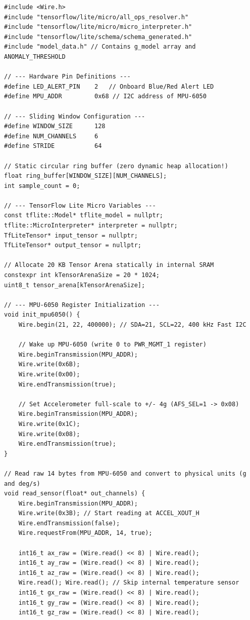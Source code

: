 \begin{lstlisting}[style=pythonstyle, caption={Production ESP32 C++ Anomaly Detection Firmware with TFLM.}, label={lst:esp32_firmware}]
#include <Wire.h>
#include "tensorflow/lite/micro/all_ops_resolver.h"
#include "tensorflow/lite/micro/micro_interpreter.h"
#include "tensorflow/lite/schema/schema_generated.h"
#include "model_data.h" // Contains g_model array and ANOMALY_THRESHOLD

// --- Hardware Pin Definitions ---
#define LED_ALERT_PIN    2   // Onboard Blue/Red Alert LED
#define MPU_ADDR         0x68 // I2C address of MPU-6050

// --- Sliding Window Configuration ---
#define WINDOW_SIZE      128
#define NUM_CHANNELS     6
#define STRIDE           64

// Static circular ring buffer (zero dynamic heap allocation!)
float ring_buffer[WINDOW_SIZE][NUM_CHANNELS];
int sample_count = 0;

// --- TensorFlow Lite Micro Variables ---
const tflite::Model* tflite_model = nullptr;
tflite::MicroInterpreter* interpreter = nullptr;
TfLiteTensor* input_tensor = nullptr;
TfLiteTensor* output_tensor = nullptr;

// Allocate 20 KB Tensor Arena statically in internal SRAM
constexpr int kTensorArenaSize = 20 * 1024;
uint8_t tensor_arena[kTensorArenaSize];

// --- MPU-6050 Register Initialization ---
void init_mpu6050() {
    Wire.begin(21, 22, 400000); // SDA=21, SCL=22, 400 kHz Fast I2C
    
    // Wake up MPU-6050 (write 0 to PWR_MGMT_1 register)
    Wire.beginTransmission(MPU_ADDR);
    Wire.write(0x6B);
    Wire.write(0x00);
    Wire.endTransmission(true);

    // Set Accelerometer full-scale to +/- 4g (AFS_SEL=1 -> 0x08)
    Wire.beginTransmission(MPU_ADDR);
    Wire.write(0x1C);
    Wire.write(0x08);
    Wire.endTransmission(true);
}

// Read raw 14 bytes from MPU-6050 and convert to physical units (g and deg/s)
void read_sensor(float* out_channels) {
    Wire.beginTransmission(MPU_ADDR);
    Wire.write(0x3B); // Start reading at ACCEL_XOUT_H
    Wire.endTransmission(false);
    Wire.requestFrom(MPU_ADDR, 14, true);

    int16_t ax_raw = (Wire.read() << 8) | Wire.read();
    int16_t ay_raw = (Wire.read() << 8) | Wire.read();
    int16_t az_raw = (Wire.read() << 8) | Wire.read();
    Wire.read(); Wire.read(); // Skip internal temperature sensor
    int16_t gx_raw = (Wire.read() << 8) | Wire.read();
    int16_t gy_raw = (Wire.read() << 8) | Wire.read();
    int16_t gz_raw = (Wire.read() << 8) | Wire.read();


\end{lstlisting}
